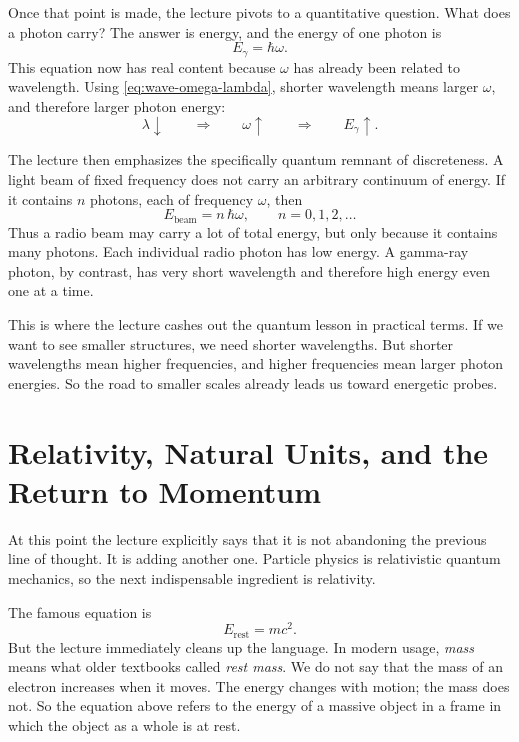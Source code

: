 Once that point is made, the lecture pivots to a quantitative question. What does a photon carry? The answer is energy, and the energy of one photon is
\begin{equation}
E_\gamma = \hbar\omega.
\end{equation}
This equation now has real content because \(\omega\) has already been related to wavelength. Using \eqref{eq:wave-omega-lambda}, shorter wavelength means larger \(\omega\), and therefore larger photon energy:
\begin{equation}
\lambda \downarrow
\qquad \Longrightarrow \qquad
\omega \uparrow
\qquad \Longrightarrow \qquad
E_\gamma \uparrow.
\end{equation}

The lecture then emphasizes the specifically quantum remnant of discreteness. A light beam of fixed frequency does not carry an arbitrary continuum of energy. If it contains \(n\) photons, each of frequency \(\omega\), then
\begin{equation}
E_{\text{beam}} = n\,\hbar\omega,
\qquad
n=0,1,2,\dots
\end{equation}
Thus a radio beam may carry a lot of total energy, but only because it contains many photons. Each individual radio photon has low energy. A gamma-ray photon, by contrast, has very short wavelength and therefore high energy even one at a time.

This is where the lecture cashes out the quantum lesson in practical terms. If we want to see smaller structures, we need shorter wavelengths. But shorter wavelengths mean higher frequencies, and higher frequencies mean larger photon energies. So the road to smaller scales already leads us toward energetic probes.

\section{Relativity, Natural Units, and the Return to Momentum}

At this point the lecture explicitly says that it is not abandoning the previous line of thought. It is adding another one. Particle physics is relativistic quantum mechanics, so the next indispensable ingredient is relativity.

The famous equation is
\begin{equation}
E_{\mathrm{rest}} = mc^2.
\end{equation}
But the lecture immediately cleans up the language. In modern usage, \emph{mass} means what older textbooks called \emph{rest mass}. We do not say that the mass of an electron increases when it moves. The energy changes with motion; the mass does not. So the equation above refers to the energy of a massive object in a frame in which the object as a whole is at rest.


